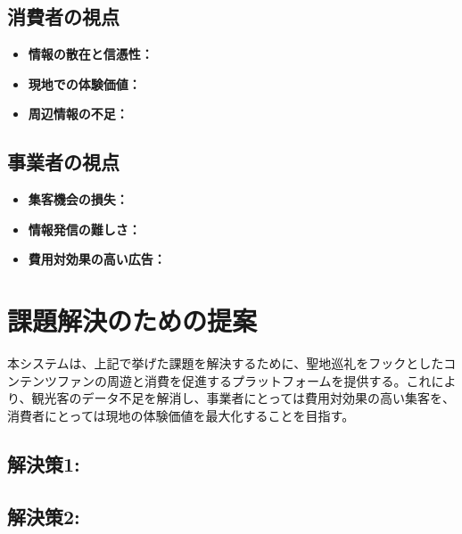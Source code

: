 \documentclass{docs}
\begin{document}
\subsection{消費者の視点}
\begin{itemize}
    \item \textbf{情報の散在と信憑性：}
    \item \textbf{現地での体験価値：}
    \item \textbf{周辺情報の不足：}
\end{itemize}


\subsection{事業者の視点}
\begin{itemize}
    \item \textbf{集客機会の損失：}
    \item \textbf{情報発信の難しさ：}
    \item \textbf{費用対効果の高い広告：}
\end{itemize}

\section{課題解決のための提案}

本システムは、上記で挙げた課題を解決するために、聖地巡礼をフックとしたコンテンツファンの周遊と消費を促進するプラットフォームを提供する。これにより、観光客のデータ不足を解消し、事業者にとっては費用対効果の高い集客を、消費者にとっては現地の体験価値を最大化することを目指す。



\subsection{解決策1: }

\subsection{解決策2: }
\end{document}
